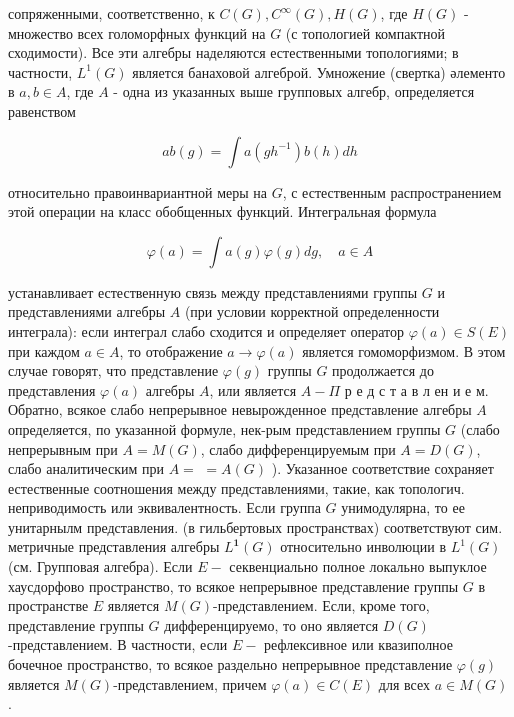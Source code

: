 \documentclass[10pt]{article}
\begin{document}
сопряженными, соответственно, к $C(G), C^{\infty}(G), H(G)$, где $H(G)$ - множество всех голоморфных функций на $G$ (с топологией компактной сходимости). Все эти алгебры наделяются естественными топологиями; в частности, $L^{1}(G)$ является банаховой алгеброй. Умножение (свертка) әлементо в $a, b \in A$, где $A$ - одна из указанных выше групповых алгебр, определяется равенством



\[

a b(g)=\int a\left(g h^{-1}\right) b(h) d h

\]



относительно правоинвариантной меры на $G$, с естественным распространением этой операции на класс обобщенных функций. Интегральная формула



\[

\varphi(a)=\int a(g) \varphi(g) d g, \quad a \in A

\]



устанавливает естественную связь между представлениями группы $G$ и представлениями алгебры $A$ (при условии корректной определенности интеграла): если интеграл слабо сходится и определяет оператор $\varphi(a) \in S(E)$ при каждом $a \in A$, то отображение $a \rightarrow \varphi(a)$ является гомоморфизмом. В этом случае говорят, что представление $\varphi(g)$ группы $G$ продолжается до представления $\varphi(a)$ алгебры $A$, или является $A-\Pi$ р е д с т а в л ен и е м. Обратно, всякое слабо непрерывное невырожденное представление алгебры $A$ определяется, по указанной формуле, нек-рым представлением группы $G$ (слабо непрерывным при $A=M(G)$, слабо дифференцируемым при $A=D(G)$, слабо аналитическим при $A=$ $=A(G)$ ). Указанное соответствие сохраняет естественные соотношения между представлениями, такие, как топологич. неприводимость или эквивалентность. Если группа $G$ унимодулярна, то ее унитарнылм представления. (в гильбертовых пространствах) соответствуют сим. метричные представления алгебры $L^{\mathbf{1}}(G)$ относительно инволюции в $L^{1}(G)$ (см. Групповая алгебра). Если $E-$ секвенциально полное локально выпуклое хаусдорфово пространство, то всякое непрерывное представление группы $G$ в пространстве $E$ является $M(G)$-представлением. Если, кроме того, представление группы $G$ дифференцируемо, то оно является $D(G)$-представлением. В частности, если $E-$ рефлексивное или квазиполное бочечное пространство, то всякое раздельно непрерывное представление $\varphi(g)$ является $M(G)$-представлением, причем $\varphi(a) \in C(E)$ для всех $a \in M(G)$.
\end{document}
